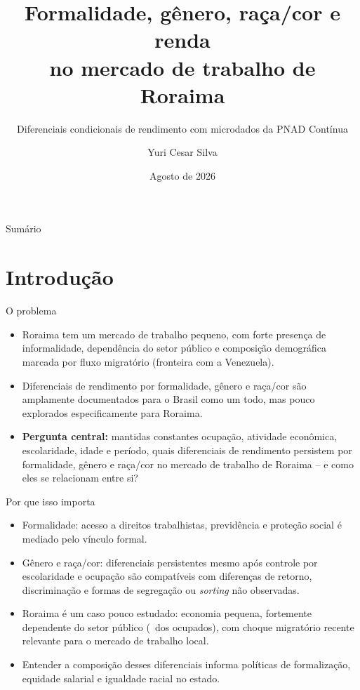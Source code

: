 \documentclass[aspectratio=169]{beamer}
\title[Formalidade, g\^enero, ra\c{c}a/cor e renda em RR]{Formalidade, g\^enero, ra\c{c}a/cor e renda\\no mercado de trabalho de Roraima}
\subtitle{Diferenciais condicionais de rendimento com microdados da PNAD Cont\'inua}
\author{Yuri Cesar Silva}
\institute{Resultados de pesquisa}
\date{Agosto de 2026}
\newcommand{\highlight}[1]{\textcolor{accentblue}{\textbf{#1}}}
\begin{document}
\begin{frame}[plain]
  \titlepage
\end{frame}

\begin{frame}{Sum\'ario}
  \tableofcontents
\end{frame}

\section{Introdu\c{c}\~ao}

\begin{frame}{O problema}
  \begin{itemize}
    \item Roraima tem um mercado de trabalho pequeno, com forte presen\c{c}a de informalidade, dependência do setor p\'ublico e composi\c{c}\~ao demogr\'afica marcada por fluxo migrat\'orio (fronteira com a Venezuela).
    \item Diferenciais de rendimento por formalidade, g\^enero e ra\c{c}a/cor s\~ao amplamente documentados para o Brasil como um todo, mas pouco explorados especificamente para Roraima.
    \item \highlight{Pergunta central:} mantidas constantes ocupa\c{c}\~ao, atividade econ\^omica, escolaridade, idade e per\'iodo, quais diferenciais de rendimento persistem por formalidade, g\^enero e ra\c{c}a/cor no mercado de trabalho de Roraima -- e como eles se relacionam entre si?
  \end{itemize}
\end{frame}

\begin{frame}{Por que isso importa}
  \begin{itemize}
    \item Formalidade: acesso a direitos trabalhistas, previd\^encia e prote\c{c}\~ao social \'e mediado pelo v\'inculo formal.
    \item G\^enero e ra\c{c}a/cor: diferenciais persistentes mesmo ap\'os controle por escolaridade e ocupa\c{c}\~ao s\~ao compat\'iveis com diferen\c{c}as de retorno, discrimina\c{c}\~ao e formas de segrega\c{c}\~ao ou \emph{sorting} n\~ao observadas.
    \item Roraima \'e um caso pouco estudado: economia pequena, fortemente dependente do setor p\'ublico (\PctSetorPublico\ dos ocupados), com choque migrat\'orio recente relevante para o mercado de trabalho local.
    \item Entender a composi\c{c}\~ao desses diferenciais informa pol\'iticas de formaliza\c{c}\~ao, equidade salarial e igualdade racial no estado.
  \end{itemize}
\end{frame}
\end{document}
